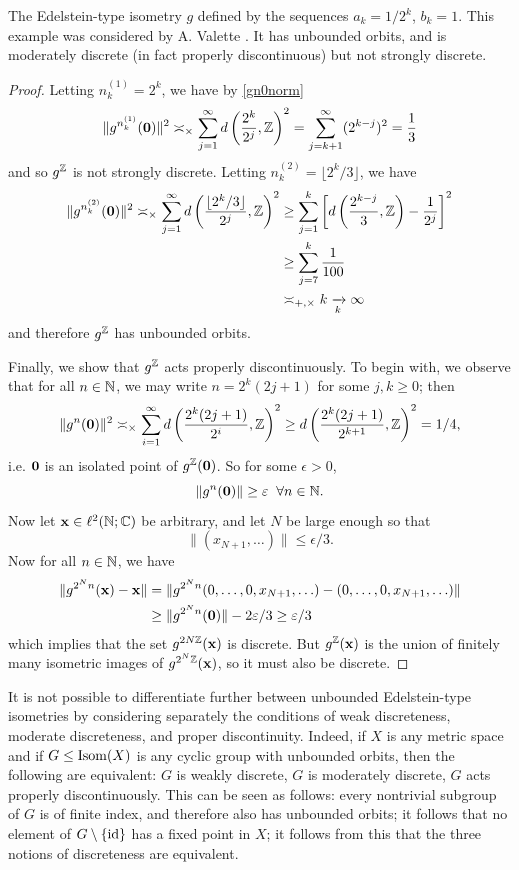 \begin{edelsteinexample}
\label{examplevalette}
The Edelstein-type isometry $g$ defined by the sequences $a_k = 1/2^k$, $b_k = 1$. This example was considered by A. Valette \cite[Proposition 1.7]{Valette}. It has unbounded orbits, and is moderately discrete (in fact properly discontinuous) but not strongly discrete.
\end{edelsteinexample}
\begin{proof}
Letting $n_k^{(1)} = 2^k$, we have by \eqref{gn0norm}
\[
\|g^{n_k^{(1)}}(\0)\|^2 \asymp_\times \sum_{j = 1}^\infty \dist\left(\frac{2^k}{2^j},\Z\right)^2
= \sum_{j = k + 1}^\infty (2^{k - j})^2 = \frac 13
\]
and so $g^\Z$ is not strongly discrete. Letting $n_k^{(2)} = \lfloor 2^k/3\rfloor$, we have
\begin{align*}
\|g^{n_k^{(2)}}(\0)\|^2 \asymp_\times \sum_{j = 1}^\infty \dist\left(\frac{\lfloor 2^k/3\rfloor}{2^j},\Z\right)^2
&\geq \sum_{j = 1}^k \left[\dist\left(\frac{2^{k - j}}{3},\Z\right) - \frac{1}{2^j}\right]^2\\ 
&\geq \sum_{j = 7}^k \frac{1}{100}\\ 
&\asymp_{\plus,\times} k \tendsto k \infty
\end{align*}
and therefore $g^\Z$ has unbounded orbits.

Finally, we show that $g^\Z$ acts properly discontinuously. To begin with, we observe that for all $n\in\Namer$, we may write $n = 2^k (2j + 1)$ for some $j,k\geq 0$; then
\[
\|g^n(\0)\|^2 \asymp_\times \sum_{i = 1}^\infty \dist\left(\frac{2^k (2j + 1)}{2^i},\Z\right)^2
\geq \dist\left(\frac{2^k (2j + 1)}{2^{k + 1}},\Z\right)^2 = 1/4,
\]
i.e. $\mathbf 0$ is an isolated point of $g^\Z(\0)$. So for some $\epsilon > 0$,
\[
\|g^n(\0)\| \geq \epsilon \all n\in\Namer.
\]
Now let $\xx\in\ell^2(\N;\C)$ be arbitrary, and let $N$ be large enough so that 
\[
\|(x_{N + 1},\ldots)\| \leq \epsilon/3.
\] 
Now for all $n\in\Namer$, we have 
\begin{align*}
\|g^{2^N n}(\mathbf x) - \mathbf x\| &= \|g^{2^N n}(0,\ldots,0,x_{N + 1},\ldots) - (0,\ldots,0,x_{N + 1},\ldots)\|\\ 
&\geq \|g^{2^N n}(\mathbf 0)\| - 2\varepsilon/3 \geq \varepsilon/3
\end{align*}
which implies that the set $g^{2N \Z}(\xx)$ is discrete. But $g^\Z(\xx)$ is the union of finitely many isometric images of $g^{2^N\Z}(\xx)$, so it must also be discrete.
\end{proof}
\begin{remark}
It is not possible to differentiate further between unbounded Edelstein-type isometries by considering separately the conditions of weak discreteness, moderate discreteness, and proper discontinuity. Indeed, if $X$ is any metric space and if $G\leq\operatorname{Isom}(X)$ is any cyclic group with unbounded orbits, then the following are equivalent: $G$ is weakly discrete, $G$ is moderately discrete, $G$ acts properly discontinuously. This can be seen as follows: every nontrivial subgroup of $G$ is of finite index, and therefore also has unbounded orbits; it follows that no element of $G\setminus\{\mathrm{id}\}$ has a fixed point in $X$; it follows from this that the three notions of discreteness are equivalent.
\end{remark}


